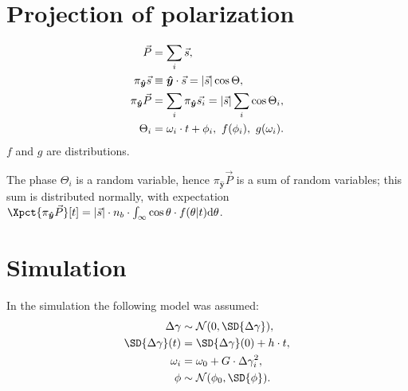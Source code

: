 \documentclass{article}
\newcommand{\uvec}[1]{\boldsymbol{\hat{#1}}}
\newcommand{\abs}[1]{\vert#1\vert}
\newcommand{\proj}[2]{\pi_{\uvec{#2}}\vec{#1}}
\begin{document}
\section{Projection of polarization}
\begin{align}
	\vec{P} &= \sum_i \vec{s}, \notag\\
	\proj{s}{y} &\equiv \uvec{y}\cdot\vec{s} = \abs{\vec{s}}\cos\Theta, \notag\\
	\proj{P}{y} &= \sum_i \proj{s_i}{y} = \abs{\vec{s}}\sum_i \cos\Theta_i, \label{eq:SumSpins}\\
	\Theta_i &= \omega_i\cdot t + \phi_i,~ f(\phi_i),~g(\omega_i).\notag
\end{align}
$f$ and $g$ are distributions.

The phase $\Theta_i$ is a random variable, hence $\proj{P}{y}$ is a sum of random variables; this sum is distributed normally, with expectation $\Xpct{\proj{P}{y}}[t] = \abs{\vec{s}}\cdot n_b\cdot \int_\infty\cos\theta\cdot f(\theta|t)\td\theta$.

\section{Simulation}
\newcommand{\Norm}{\mathcal{N}}
\newcommand{\dy}{\Delta\gamma}
\newcommand{\ycoef}{h}
\newcommand{\wcoef}{G}
\newcommand{\dwcoef}{g}
In the simulation the following model was assumed:
\begin{align*}
	\dy &\sim \Norm(0, \SD{\dy}), \\
	\SD{\dy}(t) &= \SD{\dy}(0) + \ycoef\cdot t, \\
	\omega_i &= \omega_0 + \wcoef\cdot \dy_i^2, \\
	\phi &\sim \Norm(\phi_0, \SD{\phi}).
\end{align*}
\end{document}
